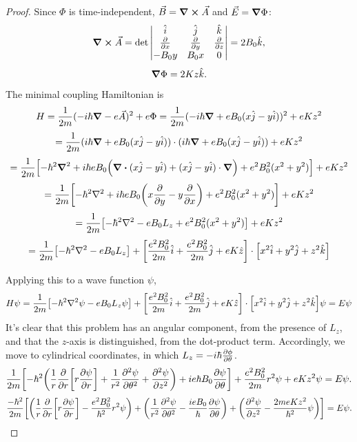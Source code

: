 \documentclass{article}
\begin{document}
\begin{proof}
  Since $\Phi$ is time-independent, $\vec{B} = \curl{\vec{A}}$ and $\vec{E} = \grad{\Phi}$:
  \[
    \curl{\vec{A}} = \det
    \begin{vmatrix}
      \hat{i} & \hat{j} & \hat{k} \\
      \pdv{x} & \pdv{y} & \pdv{z} \\
      -B_{0}y & B_{0}x & 0
    \end{vmatrix}
    = 2B_{0}\hat{k},
  \]
  \[
    \grad{\Phi} = 2Kz\hat{k}.
  \]

  The minimal coupling Hamiltonian is
  \[
    H = \frac{1}{2m}(-i\hbar\grad - e\vec{A})^{2} + e\Phi
    = \frac{1}{2m}(-i\hbar\grad + eB_{0}(x\hat{j} - y\hat{i}))^{2} + eKz^{2}
  \]
  \[
    = \frac{1}{2m}(i\hbar\grad + eB_{0}(x\hat{j} - y\hat{i})) \cdot (i\hbar\grad + eB_{0}(x\hat{j} - y\hat{i})) + eKz^{2}
  \]
  \[
    = \frac{1}{2m}\qty[-\hbar^{2}\grad^{2} + i\hbar eB_{0}\qty(\div{(x\hat{j} - y\hat{i})} + (x\hat{j} - y\hat{i}) \cdot \grad)
    + e^{2}B_{0}^{2}(x^{2} + y^{2})] + eKz^{2}
  \]
  \[
    = \frac{1}{2m}\qty[-\hbar^{2}\laplacian + i\hbar eB_{0}\qty(x\pdv{y} - y\pdv{x}) + e^{2}B_{0}^{2}(x^{2} + y^{2})] + eKz^{2}
  \]
  \[
    = \frac{1}{2m}\qty[-\hbar^{2}\laplacian - eB_{0}L_{z} + e^{2}B_{0}^{2}(x^{2} + y^{2})] + eKz^{2}
  \]
  \[
    = \frac{1}{2m}\qty[-\hbar^{2}\laplacian - eB_{0}L_{z}] + \qty[\frac{e^{2}B_{0}^{2}}{2m}\hat{i} + \frac{e^{2}B_{0}^{2}}{2m}\hat{j} + eK\hat{z}]
    \cdot \qty[x^{2}\hat{i} + y^{2}\hat{j} + z^{2}\hat{k}]
  \]

  Applying this to a wave function $\psi$,
  \[
    H\psi = \frac{1}{2m}\qty[-\hbar^{2}\laplacian{\psi} - eB_{0}L_{z}\psi] + \qty[\frac{e^{2}B_{0}^{2}}{2m}\hat{i}
    + \frac{e^{2}B_{0}^{2}}{2m}\hat{j} + eK\hat{z}] \cdot \qty[x^{2}\hat{i} + y^{2}\hat{j} + z^{2}\hat{k}]\psi = E\psi
  \]
  It's clear that this problem has an angular component, from the presence of $L_{z}$, and that the $z$-axis is distinguished,
  from the dot-product term.
  Accordingly, we move to cylindrical coordinates, in which $L_{z} = -i\hbar\pdv{\phi}{\theta}$.
  \[
    \frac{1}{2m}\qty[-\hbar^{2}\qty(\frac{1}{r}\pdv{r}\qty[r\pdv{\psi}{r}] + \frac{1}{r^{2}}\pdv[2]{\psi}{\theta} + \pdv[2]{\psi}{z})
    + ie\hbar B_{0}\pdv{\psi}{\theta}] + \frac{e^{2}B_{0}^{2}}{2m}r^{2}\psi + eKz^{2}\psi = E\psi.
  \]
  \[
    \frac{-\hbar^{2}}{2m}\qty[\qty(\frac{1}{r}\pdv{r}\qty[r\pdv{\psi}{r}] - \frac{e^{2}B_{0}^{2}}{\hbar^{2}}r^{2}\psi)
    + \qty(\frac{1}{r^{2}}\pdv[2]{\psi}{\theta} -\frac{ieB_{0}}{\hbar}\pdv{\psi}{\theta})
    + \qty(\pdv[2]{\psi}{z} - \frac{2meKz^{2}}{\hbar^{2}}\psi)]  = E\psi.

\]
\end{proof}
\end{document}
